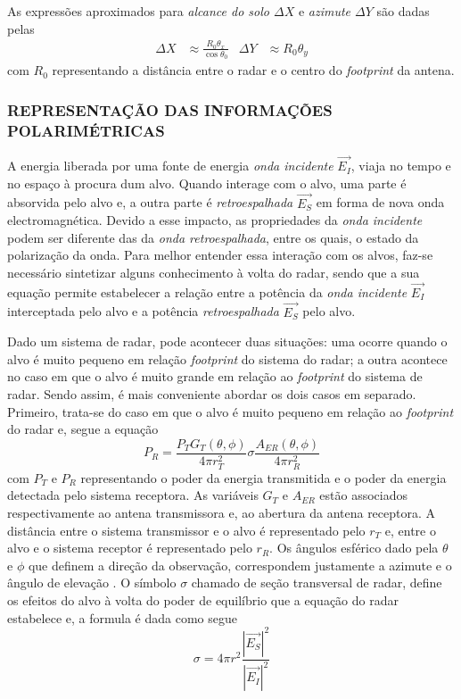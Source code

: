 \documentclass[a4paper,12pt]{article}
\begin{document}
As expressões aproximados para \textit{alcance do solo $\Delta X$} e \textit{azimute $\Delta Y$} são dadas pelas
\begin{align}
    \Delta X & \approx \frac{R_{0}\theta_{x}}{\cos{\theta_{0}}} &
    \Delta Y & \approx R_{0}\theta_{y}
\end{align}
com $R_{0}$ representando a distância entre o radar e o centro do \textit{footprint} da antena.

\subsubsection{REPRESENTAÇÃO DAS INFORMAÇÕES POLARIMÉTRICAS}
\label{subsubsec:rep}

A energia liberada por uma fonte de energia \textit{onda incidente} $\vec{E_{I}}$, viaja no tempo e no espaço à procura dum alvo. Quando interage com o alvo, uma parte é absorvida pelo alvo e, a outra parte é \textit{retroespalhada} $\vec{E_{S}}$ em forma de nova onda electromagnética. Devido a esse impacto, as propriedades da \textit{onda incidente} podem ser diferente das da \textit{onda retroespalhada}, entre os quais, o estado da polarização da onda. Para melhor entender essa interação com os alvos, faz-se necessário sintetizar alguns conhecimento à volta do radar, sendo que a sua equação permite estabelecer a relação entre a potência da \textit{onda incidente} $\vec{E_{I}}$ interceptada pelo alvo e a potência \textit{retroespalhada} $\vec{E_{S}}$ pelo alvo.

Dado um sistema de radar, pode acontecer duas situações: uma ocorre quando o alvo é muito pequeno em relação \textit{footprint} do sistema do radar; a outra acontece no caso em que o alvo é muito grande em relação ao \textit{footprint} do sistema de radar. Sendo assim, é mais conveniente abordar os dois casos em separado. Primeiro, trata-se do caso em que o alvo é muito pequeno em relação ao \textit{footprint} do radar e, segue a equação
\begin{equation}
    P_{R}=\frac{P_{T}G_{T}(\theta, \phi)}{4\pi r^2_{T}}\sigma\frac{A_{ER}(\theta, \phi)}{4\pi r^2_{R}}
\end{equation}
com $P_{T}$ e $P_{R}$ representando o poder da energia transmitida e o poder da energia detectada pelo sistema receptora. As variáveis $G_{T}$ e $A_{ER}$ estão associados respectivamente ao antena transmissora e, ao abertura da antena receptora. A distância entre o sistema transmissor e o alvo é representado pelo $r_{T}$ e, entre o alvo e o sistema receptor é representado pelo $r_{R}$. Os ângulos esférico dado pela $\theta$ e $\phi$ que definem a direção da observação, correspondem justamente a azimute e o ângulo de elevação \cite{jong:2009}. O símbolo $\sigma$ chamado de seção transversal de radar, define os efeitos do alvo à volta do poder de equilíbrio que a equação do radar estabelece e, a formula é dada como segue
\begin{equation}
    \sigma = 4\pi r^2 \frac{|\vec{E_{S}}|^2}{|\vec{E_{I}}|^2}
\end{equation}
\end{document}
